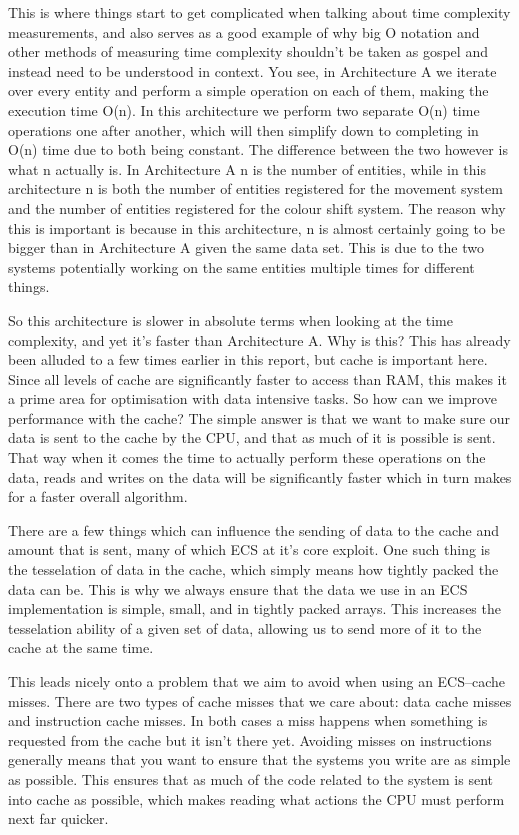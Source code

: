 \documentclass{article}
\begin{document}
This is where things start to get complicated when talking about time
complexity measurements, and also serves as a good example of why big O notation
and other methods of measuring time complexity shouldn't be taken as gospel and
instead need to be understood in context. You see, in Architecture A we iterate
over every entity and perform a simple operation on each of them, making the
execution time O(n). In this architecture we perform two separate O(n) time
operations one after another, which will then simplify down to completing in
O(n) time due to both being constant. The difference between the two however is
what n actually is. In Architecture A n is the number of entities, while in this
architecture n is both the number of entities registered for the movement system
and the number of entities registered for the colour shift system. The reason
why this is important is because in this architecture, n is almost certainly
going to be bigger than in Architecture A given the same data set. This is due
to the two systems potentially working on the same entities multiple times for
different things.

So this architecture is slower in absolute terms when looking at the time
complexity, and yet it's faster than Architecture A. Why is this? This has
already been alluded to a few times earlier in this report, but cache is
important here. Since all levels of cache are significantly faster to access
than RAM, this makes it a prime area for optimisation with data intensive tasks.
So how can we improve performance with the cache? The simple answer is that we
want to make sure our data is sent to the cache by the CPU, and that as much of
it is possible is sent. That way when it comes the time to actually perform
these operations on the data, reads and writes on the data will be significantly
faster which in turn makes for a faster overall algorithm.

There are a few things which can influence the sending of data to the cache and
amount that is sent, many of which ECS at it's core exploit. One such thing is
the tesselation of data in the cache, which simply means how tightly packed the
data can be. This is why we always ensure that the data we use in an ECS
implementation is simple, small, and in tightly packed arrays. This increases
the tesselation ability of a given set of data, allowing us to send more of it
to the cache at the same time.

This leads nicely onto a problem that we aim to avoid when using an ECS--cache
misses. There are two types of cache misses that we care about: data cache
misses and instruction cache misses. In both cases a miss happens when something
is requested from the cache but it isn't there yet. Avoiding misses on
instructions generally means that you want to ensure that the systems you write
are as simple as possible. This ensures that as much of the code related to the
system is sent into cache as possible, which makes reading what actions the CPU
must perform next far quicker.
\end{document}
